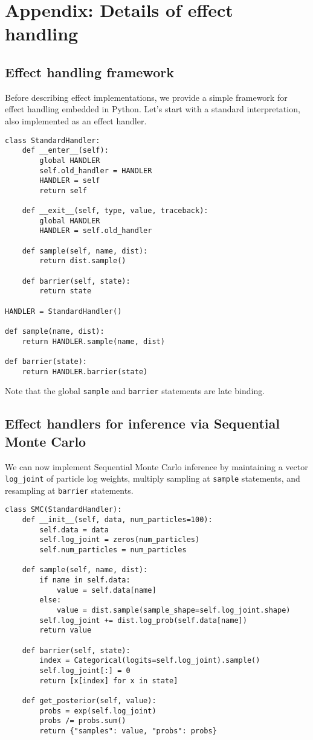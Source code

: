 \documentclass[anonymous=false, %
               format=acmsmall, %
               review=true, %
               screen=true, %
               nonacm=true]{acmart}
\begin{document}
\section{Appendix: Details of effect handling}

\subsection{Effect handling framework}
Before describing effect implementations, we provide a simple framework for effect handling embedded in Python.
Let's start with a standard interpretation, also implemented as an effect handler.
\begin{verbatim}
class StandardHandler:
    def __enter__(self):
        global HANDLER
        self.old_handler = HANDLER
        HANDLER = self
        return self

    def __exit__(self, type, value, traceback):
        global HANDLER
        HANDLER = self.old_handler

    def sample(self, name, dist):
        return dist.sample()

    def barrier(self, state):
        return state

HANDLER = StandardHandler()

def sample(name, dist):
    return HANDLER.sample(name, dist)

def barrier(state):
    return HANDLER.barrier(state)
\end{verbatim}
Note that the global \verb$sample$ and \verb$barrier$ statements are late binding.

\subsection{Effect handlers for inference via Sequential Monte Carlo}
\label{sec:appendix:smc}
We can now implement Sequential Monte Carlo inference by maintaining a vector \verb$log_joint$ of particle log weights, multiply sampling at \verb$sample$ statements, and resampling at \verb$barrier$ statements.
\begin{verbatim}
class SMC(StandardHandler):
    def __init__(self, data, num_particles=100):
        self.data = data
        self.log_joint = zeros(num_particles)
        self.num_particles = num_particles

    def sample(self, name, dist):
        if name in self.data:
            value = self.data[name]
        else:
            value = dist.sample(sample_shape=self.log_joint.shape)
        self.log_joint += dist.log_prob(self.data[name])
        return value

    def barrier(self, state):
        index = Categorical(logits=self.log_joint).sample()
        self.log_joint[:] = 0
        return [x[index] for x in state]

    def get_posterior(self, value):
        probs = exp(self.log_joint)
        probs /= probs.sum()
        return {"samples": value, "probs": probs}
\end{verbatim}
\end{document}
